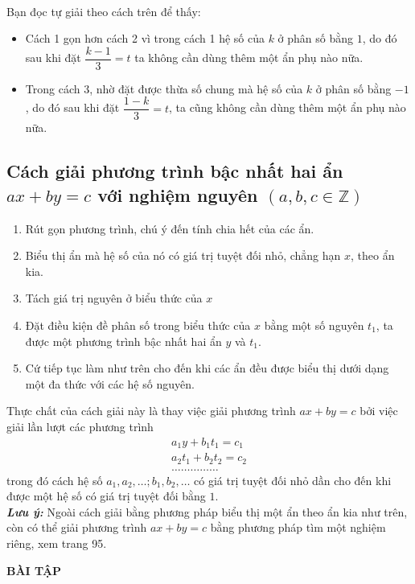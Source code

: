 \begin{vd}
{\begin{align*}
\end{align*}
Bạn đọc  tự giải theo cách trên để thấy:
\begin{itemize}
	\item Cách 1 gọn hơn cách 2 vì trong cách 1 hệ số của $k$ ở phân số bằng $1$, do đó sau khi đặt $\dfrac{k-1}{3}=t$ ta không cần dùng thêm một ẩn phụ nào nữa.
	\item Trong cách 3, nhờ đặt được thừa số chung mà hệ số của $k$ ở phân số bằng $-1$, do đó sau khi đặt $\dfrac{1-k}{3}=t$, ta cũng không cần dùng thêm một ẩn phụ nào nữa.
\end{itemize} 
}	
\end{vd}
\subsection{Cách giải phương trình bậc nhất hai ẩn  $ax+by=c$ với nghiệm nguyên $(a, b, c \in \mathbb{Z})$}

\begin{enumerate}[-]
	\item Rút gọn phương trình, chú ý đến tính chia hết của các ẩn.
	\item Biểu thị ẩn mà hệ số của nó có giá trị tuyệt đối nhỏ, chẳng hạn $x$, theo ẩn kia.
	\item Tách giá trị nguyên ở biểu thức của $x$
	\item Đặt điều kiện đề phân số trong biểu thức của $x$ bằng một	 số nguyên $t_1$, ta được một phương trình  bậc nhất hai ẩn $y$ và $t_1$.
	\item  Cứ tiếp tục làm như trên cho đến khi các ẩn đều được biểu thị dưới dạng một  đa thức với các hệ số nguyên.
\end{enumerate} 	
 Thực chất của cách giải này là thay việc giải phương trình $ax+by=c$  bởi việc giải lần lượt các phương trình 
 \begin{align*}
 a_1y+b_1t_1=c_1\\a_2t_1+b_2t_2=c_2\\ \ldots\ldots\ldots\ldots\ldots
 \end{align*}
 trong đó cách hệ số $a_1, a_2,\ldots ; b_1, b_2, \ldots $ có giá trị tuyệt đối nhỏ dần cho đến khi được một hệ số có giá trị tuyệt đối bằng $1$.\\
 \textbf{\textit{Lưu ý:}} Ngoài cách giải bằng phương pháp biểu thị một ẩn theo ẩn kia như trên, còn có thể giải phương trình $ax+by=c$ bằng phương pháp tìm một nghiệm riêng, xem trang 95.
\begin{center}
    \textbf{BÀI TẬP}
\end{center}

